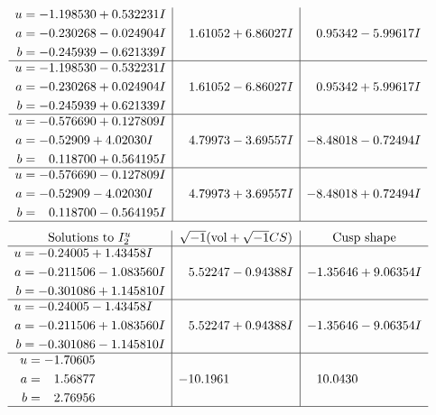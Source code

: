 \documentclass[1p]{elsarticle_modified}
\theoremstyle{definition}
\newcommand{\I}{\sqrt{-1}}
\begin{document}
$$\begin{array}{c|c|c}
\begin{aligned}
u &= -1.198530 + 0.532231 I \\
a &= -0.230268 - 0.024904 I \\
b &= -0.245939 - 0.621339 I\end{aligned}
 & \phantom{-}1.61052 + 6.86027 I & \phantom{-}0.95342 - 5.99617 I \\ \hline\begin{aligned}
u &= -1.198530 - 0.532231 I \\
a &= -0.230268 + 0.024904 I \\
b &= -0.245939 + 0.621339 I\end{aligned}
 & \phantom{-}1.61052 - 6.86027 I & \phantom{-}0.95342 + 5.99617 I \\ \hline\begin{aligned}
u &= -0.576690 + 0.127809 I \\
a &= -0.52909 + 4.02030 I \\
b &= \phantom{-}0.118700 + 0.564195 I\end{aligned}
 & \phantom{-}4.79973 - 3.69557 I & -8.48018 - 0.72494 I \\ \hline\begin{aligned}
u &= -0.576690 - 0.127809 I \\
a &= -0.52909 - 4.02030 I \\
b &= \phantom{-}0.118700 - 0.564195 I\end{aligned}
 & \phantom{-}4.79973 + 3.69557 I & -8.48018 + 0.72494 I\\
 \hline 
 \end{array}$$\newpage$$\begin{array}{c|c|c}  
\text{Solutions to }I^u_{2}& \I (\text{vol} + \sqrt{-1}CS) & \text{Cusp shape}\\
 \hline 
\begin{aligned}
u &= -0.24005 + 1.43458 I \\
a &= -0.211506 - 1.083560 I \\
b &= -0.301086 + 1.145810 I\end{aligned}
 & \phantom{-}5.52247 - 0.94388 I & -1.35646 + 9.06354 I \\ \hline\begin{aligned}
u &= -0.24005 - 1.43458 I \\
a &= -0.211506 + 1.083560 I \\
b &= -0.301086 - 1.145810 I\end{aligned}
 & \phantom{-}5.52247 + 0.94388 I & -1.35646 - 9.06354 I \\ \hline\begin{aligned}
u &= -1.70605\phantom{ +0.000000I} \\
a &= \phantom{-}1.56877\phantom{ +0.000000I} \\
b &= \phantom{-}2.76956\phantom{ +0.000000I}\end{aligned}
 & -10.1961\phantom{ +0.000000I} & \phantom{-}10.0430\phantom{ +0.000000I}\\
 \hline 
 \end{array}$$\newpage
\end{document}
